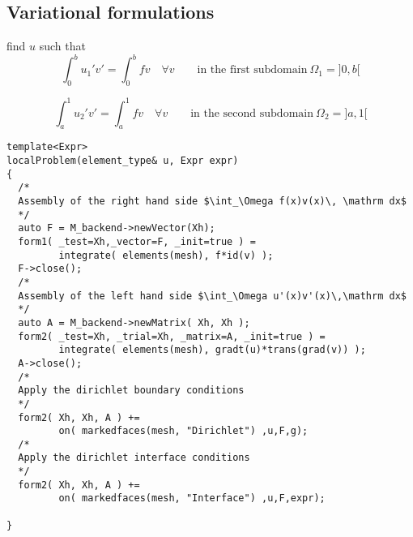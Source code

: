 \subsection{Variational formulations}
\label{sec:vari-form-1}
find $u$ such that
\begin{equation*}
  \int_0^b u_1'v' = \int_0^b fv \quad \forall v \qquad \text{in the first subdomain} ~\Omega_1 = ]0,b[
\end{equation*}

\begin{equation*}
  \int_a^1 u_2'v' = \int_a^1 fv \quad \forall v \qquad \text{in the second subdomain} ~ \Omega_2 = ]a,1[
\end{equation*}



\begin{lstlisting}
template<Expr>
localProblem(element_type& u, Expr expr)
{
  /*
  Assembly of the right hand side $\int_\Omega f(x)v(x)\, \mathrm dx$
  */
  auto F = M_backend->newVector(Xh);
  form1( _test=Xh,_vector=F, _init=true ) =
         integrate( elements(mesh), f*id(v) );
  F->close();
  /*
  Assembly of the left hand side $\int_\Omega u'(x)v'(x)\,\mathrm dx$
  */
  auto A = M_backend->newMatrix( Xh, Xh );
  form2( _test=Xh, _trial=Xh, _matrix=A, _init=true ) =
         integrate( elements(mesh), gradt(u)*trans(grad(v)) );
  A->close();
  /*
  Apply the dirichlet boundary conditions
  */
  form2( Xh, Xh, A ) +=
         on( markedfaces(mesh, "Dirichlet") ,u,F,g);
  /*
  Apply the dirichlet interface conditions
  */
  form2( Xh, Xh, A ) +=
         on( markedfaces(mesh, "Interface") ,u,F,expr);

}
\end{lstlisting}


